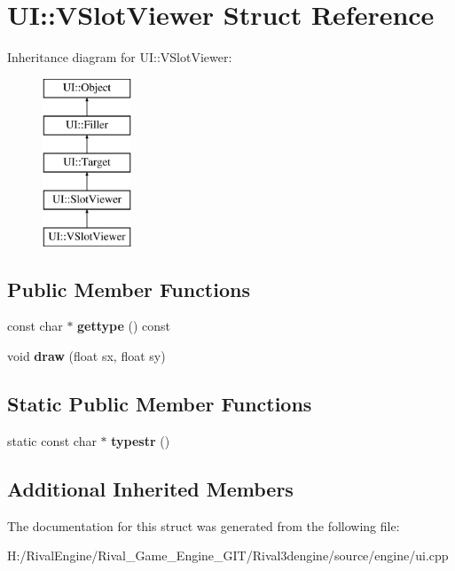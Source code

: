 \hypertarget{struct_u_i_1_1_v_slot_viewer}{}\section{UI\+:\+:V\+Slot\+Viewer Struct Reference}
\label{struct_u_i_1_1_v_slot_viewer}
Inheritance diagram for UI\+:\+:V\+Slot\+Viewer\+:\begin{figure}[H]
\begin{center}
\leavevmode
\includegraphics[height=5.000000cm]{struct_u_i_1_1_v_slot_viewer}
\end{center}
\end{figure}
\subsection*{Public Member Functions}
\begin{DoxyCompactItemize}
\item 
\mbox{\label{struct_u_i_1_1_v_slot_viewer_a735dac31cb9a068b9bbc58f86f11db73}} 
const char $\ast$ {\bfseries gettype} () const
\item 
\mbox{\label{struct_u_i_1_1_v_slot_viewer_a94c711084d5a7d2cb5dbe827b931c1de}} 
void {\bfseries draw} (float sx, float sy)
\end{DoxyCompactItemize}
\subsection*{Static Public Member Functions}
\begin{DoxyCompactItemize}
\item 
\mbox{\label{struct_u_i_1_1_v_slot_viewer_a195e49777ac0a2344aefb3dd99e44d7a}} 
static const char $\ast$ {\bfseries typestr} ()
\end{DoxyCompactItemize}
\subsection*{Additional Inherited Members}


The documentation for this struct was generated from the following file\+:\begin{DoxyCompactItemize}
\item 
H\+:/\+Rival\+Engine/\+Rival\+\_\+\+Game\+\_\+\+Engine\+\_\+\+G\+I\+T/\+Rival3dengine/source/engine/ui.\+cpp\end{DoxyCompactItemize}
